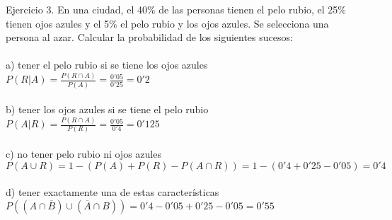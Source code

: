 
Ejercicio 3. En una ciudad, el 40\% de las personas tienen el pelo rubio, el 25\% tienen ojos azules y el 5\% el pelo rubio y los ojos azules. Se selecciona una persona al azar. Calcular la probabilidad de los siguientes sucesos: \\ \\
a) tener el pelo rubio si se tiene los ojos azules \\
$P(R|A) = \frac{P(R \cap A)}{P(A)} = \frac{0'05}{0'25} = 0'2$ \\ \\
b) tener los ojos azules si se tiene el pelo rubio \\
$P(A|R) = \frac{P(R \cap A)}{P(R)} = \frac{0'05}{0'4} = 0'125$ \\ \\
c) no tener pelo rubio ni ojos azules \\ 
$P(A \cup R) = 1 - (P(A)+P(R)-P(A\cap R)) = 1 - (0'4+0'25-0'05) = 0'4 $ \\ \\
d) tener exactamente una de estas características \\
$P((A\cap \overline{B}) \cup (\overline{A} \cap B)) = 0'4 - 0'05 + 0'25 - 0'05 = 0'55 $ \\ 